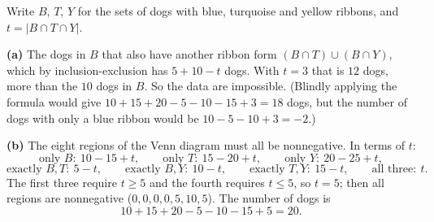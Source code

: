Write $B$, $T$, $Y$ for the sets of dogs with blue, turquoise and yellow ribbons, and $t=|B\cap T\cap Y|$.

\textbf{(a)} The dogs in $B$ that also have another ribbon form $(B\cap T)\cup(B\cap Y)$, which by inclusion-exclusion has $5+10-t$ dogs. With $t=3$ that is $12$ dogs, more than the $10$ dogs in $B$. So the data are impossible. (Blindly applying the formula would give $10+15+20-5-10-15+3=18$ dogs, but the number of dogs with only a blue ribbon would be $10-5-10+3=-2$.)

\textbf{(b)} The eight regions of the Venn diagram must all be nonnegative. In terms of $t$:
\[\text{only } B:\ 10-15+t,\qquad \text{only } T:\ 15-20+t,\qquad \text{only } Y:\ 20-25+t,\]
\[\text{exactly } B,T:\ 5-t,\qquad \text{exactly } B,Y:\ 10-t,\qquad \text{exactly } T,Y:\ 15-t,\qquad\text{all three}:\ t .\]
The first three require $t\ge5$ and the fourth requires $t\le5$, so $t=5$; then all regions are nonnegative ($0,0,0,0,5,10,5$). The number of dogs is
\[10+15+20-5-10-15+5=\boxed{20}.\]
